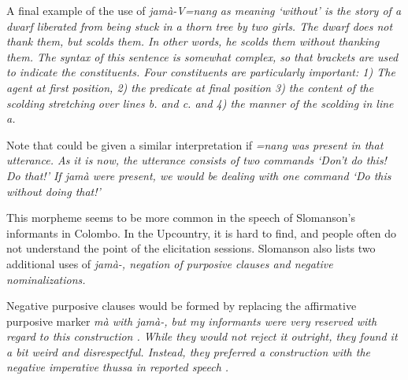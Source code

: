 A final example of the use of \em jamà-V=nang \em as meaning `without' is the story of a dwarf liberated from being stuck in a thorn tree by two girls. The dwarf does not thank them, but scolds them. In other words, he scolds them without thanking them. The syntax of this sentence is somewhat complex, so that brackets are used to indicate the constituents. Four constituents are particularly important: 1) The agent  at first position, 2) the predicate  at final position 3) the content of the scolding stretching over lines b. and c. and 4) the manner of the scolding in line a.






Note that  could be given a similar interpretation if   \em =nang \em was present in that utterance. As it is now, the utterance consists of two commands `Don't do this! Do that!' If \em jamà \em were present, we would be dealing with one command  `Do this without doing that!'



This morpheme seems to be more common in the speech of Slomanson's informants in Colombo. In the Upcountry, it is hard to find, and people often do not understand the point of the elicitation sessions.  Slomanson also lists two additional uses of \em jamà-\em, negation of purposive clauses and negative nominalizations.

Negative purposive clauses would be formed by replacing the affirmative purposive marker \em mà \em with \em jamà-\em, but my informants were very reserved with regard to this construction . While they would not reject it outright, they found it a bit weird and disrespectful. Instead, they preferred a construction with the negative imperative \em thussa \em in reported speech .



